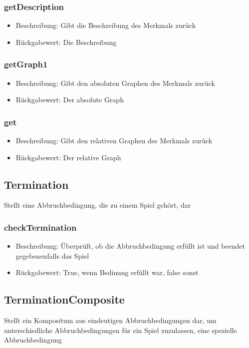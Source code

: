 \documentclass[a4paper]{scrreprt}
\begin{document}
	\subsubsection{getDescription}
	\begin{itemize}
		\item Beschreibung: Gibt die Beschreibung des Merkmals zurück
		\item Rückgabewert: Die Beschreibung
	\end{itemize}
	\subsubsection{getGraph1}
	\begin{itemize}
		\item Beschreibung: Gibt den absoluten Graphen des Merkmals zurück
		\item Rückgabewert: Der absolute Graph
	\end{itemize}
	\subsubsection{get}
	\begin{itemize}
		\item Beschreibung: Gibt den relativen Graphen des Merkmals zurück
		\item Rückgabewert: Der relative Graph
	\end{itemize}
	
	\subsection{Termination}
	Stellt eine Abbruchbedingung, die zu einem Spiel gehört, dar
	\subsubsection{checkTermination}
	\begin{itemize}
		\item Beschreibung: Überprüft, ob die Abbruchbedingung erfüllt ist und beendet gegebenenfalls das Spiel
		\item Rückgabewert: True, wenn Bedinung erfüllt war, false sonst
	\end{itemize}
	
	\subsection{TerminationComposite}
	Stellt ein Kompositum aus eindeutigen Abbruchbedingungen dar, um unterschiedliche Abbruchbedingungen für ein Spiel zuzulassen, eine spezielle Abbruchbedingung
\end{document}
